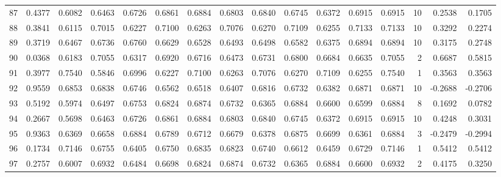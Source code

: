 \begin{tabular}{lrrrrrrrrrrrrrrr}
87  &      0.4377 &  0.6082 &  0.6463 &  0.6726 &  0.6861 &  0.6884 &  0.6803 &  0.6840 &  0.6745 &  0.6372 &   0.6915 &     0.6915 &     10 &                    0.2538 &                     0.1705 \\
88  &      0.3841 &  0.6115 &  0.7015 &  0.6227 &  0.7100 &  0.6263 &  0.7076 &  0.6270 &  0.7109 &  0.6255 &   0.7133 &     0.7133 &     10 &                    0.3292 &                     0.2274 \\
89  &      0.3719 &  0.6467 &  0.6736 &  0.6760 &  0.6629 &  0.6528 &  0.6493 &  0.6498 &  0.6582 &  0.6375 &   0.6894 &     0.6894 &     10 &                    0.3175 &                     0.2748 \\
90  &      0.0368 &  0.6183 &  0.7055 &  0.6317 &  0.6920 &  0.6716 &  0.6473 &  0.6731 &  0.6800 &  0.6684 &   0.6635 &     0.7055 &      2 &                    0.6687 &                     0.5815 \\
91  &      0.3977 &  0.7540 &  0.5846 &  0.6996 &  0.6227 &  0.7100 &  0.6263 &  0.7076 &  0.6270 &  0.7109 &   0.6255 &     0.7540 &      1 &                    0.3563 &                     0.3563 \\
92  &      0.9559 &  0.6853 &  0.6838 &  0.6746 &  0.6562 &  0.6518 &  0.6407 &  0.6816 &  0.6732 &  0.6382 &   0.6871 &     0.6871 &     10 &                   -0.2688 &                    -0.2706 \\
93  &      0.5192 &  0.5974 &  0.6497 &  0.6753 &  0.6824 &  0.6874 &  0.6732 &  0.6365 &  0.6884 &  0.6600 &   0.6599 &     0.6884 &      8 &                    0.1692 &                     0.0782 \\
94  &      0.2667 &  0.5698 &  0.6463 &  0.6726 &  0.6861 &  0.6884 &  0.6803 &  0.6840 &  0.6745 &  0.6372 &   0.6915 &     0.6915 &     10 &                    0.4248 &                     0.3031 \\
95  &      0.9363 &  0.6369 &  0.6658 &  0.6884 &  0.6789 &  0.6712 &  0.6679 &  0.6378 &  0.6875 &  0.6699 &   0.6361 &     0.6884 &      3 &                   -0.2479 &                    -0.2994 \\
96  &      0.1734 &  0.7146 &  0.6755 &  0.6405 &  0.6750 &  0.6835 &  0.6823 &  0.6740 &  0.6612 &  0.6459 &   0.6729 &     0.7146 &      1 &                    0.5412 &                     0.5412 \\
97  &      0.2757 &  0.6007 &  0.6932 &  0.6484 &  0.6698 &  0.6824 &  0.6874 &  0.6732 &  0.6365 &  0.6884 &   0.6600 &     0.6932 &      2 &                    0.4175 &                     0.3250 \\

\end{tabular}
